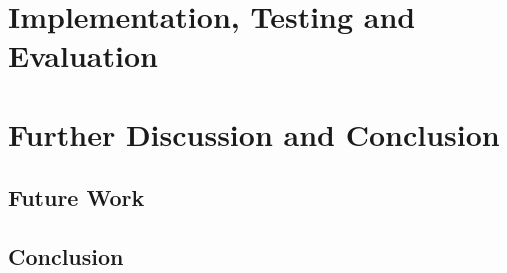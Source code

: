 \documentclass[12pt]{report}
\theoremstyle{plain}
\theoremstyle{definition}
\begin{document}
\newpage
\chapter{Implementation, Testing and Evaluation}



\newpage
\chapter{Further Discussion and Conclusion}

\section{Future Work}

\section{Conclusion}

\printbibliography
\end{document}
